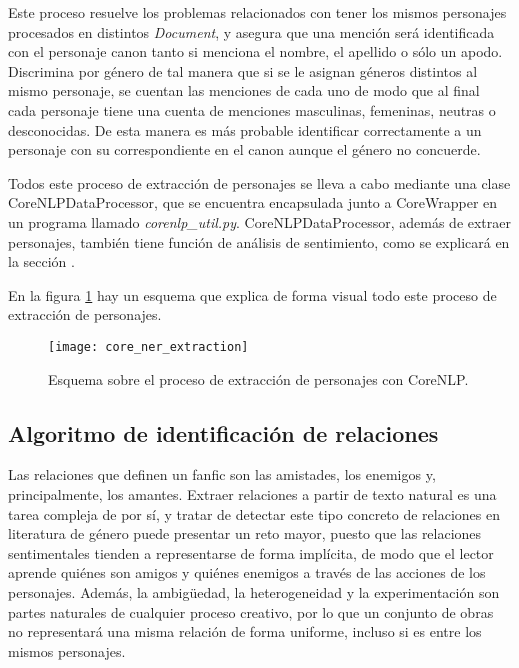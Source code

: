 \documentclass{pre-tfg}
\begin{document}
Este proceso resuelve los problemas relacionados con tener los mismos personajes procesados en distintos \textit{Document}, y asegura que una mención será identificada con el personaje canon tanto si menciona el nombre, el apellido o sólo un apodo. Discrimina por género de tal manera que si se le asignan géneros distintos al mismo personaje, se cuentan las menciones de cada uno de modo que al final cada personaje tiene una cuenta de menciones masculinas, femeninas, neutras o desconocidas. De esta manera es más probable identificar correctamente a un personaje con su correspondiente en el canon aunque el género no concuerde.

Todos este proceso de extracción de personajes se lleva a cabo mediante una clase CoreNLPDataProcessor, que se encuentra encapsulada junto a CoreWrapper en un programa llamado \textit{corenlp\_util.py}. CoreNLPDataProcessor, además de extraer personajes, también tiene función de análisis de sentimiento, como se explicará en la sección .

En la figura \ref{fig:ner_extraction_corenlp} hay un esquema que explica de forma visual todo este proceso de extracción de personajes.

\begin{figure}[!h]
	\centering
	\texttt{[image: core\_ner\_extraction]}
	\caption{Esquema sobre el proceso de extracción de personajes con CoreNLP.}
	\label{fig:ner_extraction_corenlp}
\end{figure}



\subsection{Algoritmo de identificación de relaciones}

Las relaciones que definen un fanfic son las amistades, los enemigos y, principalmente, los amantes. Extraer relaciones a partir de texto natural es una tarea compleja de por sí, y tratar de detectar este tipo concreto de relaciones en literatura de género puede presentar un reto mayor, puesto que las relaciones sentimentales tienden a representarse de forma implícita, de modo que el lector aprende quiénes son amigos y quiénes enemigos a través de las acciones de los personajes. Además, la ambigüedad, la heterogeneidad y la experimentación son partes naturales de cualquier proceso creativo, por lo que un conjunto de obras no representará una misma relación de forma uniforme, incluso si es entre los mismos personajes.
\end{document}
